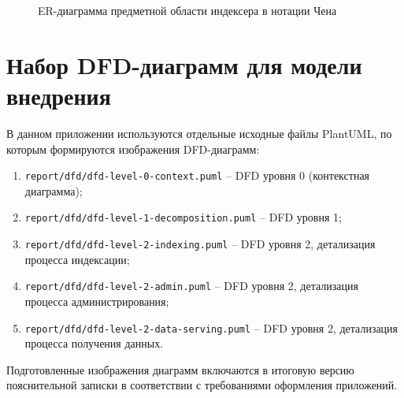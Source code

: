 ﻿\documentclass[14pt,a4paper]{extarticle}
\begin{document}
\begin{figure}[H]
{
}
\caption{ER-диаграмма предметной области индексера в нотации Чена}
\label{fig:chen-er}
\end{figure}

\newpage
\section{Набор DFD-диаграмм для модели внедрения}
\noindent В данном приложении используются отдельные исходные файлы PlantUML, по которым формируются изображения DFD-диаграмм:
\begin{enumerate}
  \item \texttt{report/dfd/dfd-level-0-context.puml} -- DFD уровня 0 (контекстная диаграмма);
  \item \texttt{report/dfd/dfd-level-1-decomposition.puml} -- DFD уровня 1;
  \item \texttt{report/dfd/dfd-level-2-indexing.puml} -- DFD уровня 2, детализация процесса индексации;
  \item \texttt{report/dfd/dfd-level-2-admin.puml} -- DFD уровня 2, детализация процесса администрирования;
  \item \texttt{report/dfd/dfd-level-2-data-serving.puml} -- DFD уровня 2, детализация процесса получения данных.
\end{enumerate}
\noindent Подготовленные изображения диаграмм включаются в итоговую версию пояснительной записки в соответствии с требованиями оформления приложений.

\newpage
\end{document}
